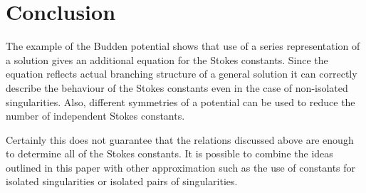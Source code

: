 \documentclass[aip,jmp,reprint]{revtex4-1}
\begin{document}
%


\section{Conclusion \label{sec:con}}
The example of the Budden potential shows that use of a series representation of a solution gives an additional equation for the Stokes constants. Since the equation reflects actual branching structure of a general solution it can correctly describe the behaviour of the Stokes constants even in the case of non-isolated singularities. Also, different symmetries of a potential can be used to reduce the number of independent Stokes constants.

Certainly this does not guarantee that the relations discussed above are enough to determine all of the Stokes constants. It is possible to combine the ideas outlined in this paper with other approximation such as the use of constants for isolated singularities or isolated pairs of singularities.
\end{document}
